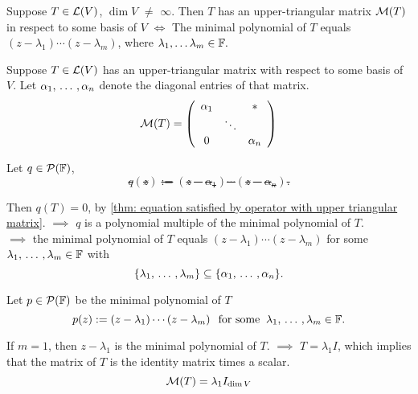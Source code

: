 \setcounter{thm}{43}
\begin{thm}
  \label{thm: necessary and sufficient condition to have an upper-triangular-matrix}
  Suppose $T\in \mathcal{L}(V)$, $\dim V$ $\neq$ $\infty$.
  Then $T$ has an upper-triangular matrix $\mathcal{M}(T)$ in respect to some basis of $V$ $\iff$ The minimal polynomial of $T$ equals $(z-\lambda_1) \cdots (z-\lambda_m)$, where $\lambda_1, \dots \lambda_m \in \mathbb{F}.$

\end{thm}
\begin{prf}
  \Rightarrowdirection Suppose $T \in \mathcal{L}(V)$ has an upper-triangular matrix with respect to some basis of $V$. Let $\alpha_1, {\, \ldots \,\,}, \alpha_n$ denote the diagonal entries of that matrix.
  \begin{equation}
  \mmatrix(T) =
  \left( {\begin{array}{ccc}
      \alpha_1 &         &  \mathlarger{*} \\
      &  \ddots &    \\
      0      &         & \alpha_n
  \end{array} } \right)
  \end{equation}

  Let $q\in \mathcal{P}(\mathbb{F})$, \st
  \begin{equation}
    q(z) := (z-\alpha_1) \cdots (z-\alpha_n).
  \end{equation}

  Then $q(T) = 0$, by \ref{thm: equation satisfied by operator with upper triangular matrix}. $\implies$ $q$ is a polynomial multiple of the minimal polynomial of $T$. \\
  $\implies$ the minimal polynomial of $T$ equals $(z-\lambda_1) \cdots (z-\lambda_m)$ for some $\lambda_1, {\, \ldots \,\,}, \lambda_m \in \mathbb{F}$ with
  \begin{equation}
    \{ \lambda_1 , {\, \ldots \,\,}, \lambda_m \} \subseteq \{\alpha_1, {\, \ldots \,\,}, \alpha_n \}.
  \end{equation}

  \Leftarrowdirection Let $p \in \mathcal{P}(\mathbb{F})$ be the minimal polynomial of $T$ \st
  \begin{equation}
    \label{eq: definition of the minimal polynomial}
    p(z) := (z-\lambda_1) \cdots (z-\lambda_m) \;\;\, \text{for some}\;\; \lambda_1, {\, \ldots \,\,}, \lambda_m \in \mathbb{F}.
  \end{equation}

  If $m=1$, then $z-\lambda_1$ is the minimal polynomial of $T$. $\implies$ $T=\lambda_1I$, which implies that the matrix of $T$ is the identity matrix times a scalar.
  \begin{equation}
    \mathcal{M}(T) = \lambda_1 I_{\dim V}
  \end{equation}


\end{prf}
